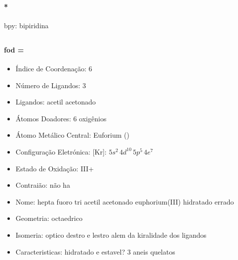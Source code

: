 \documentclass[12pt]{article}
\begin{document}
\paragraph{*}
bpy: bipiridina 

\noindent\begin{minipage}{\textwidth}
	
	\subsection{}
	\paragraph{fod =} 
	
	\begin{itemize}
   
   \item Índice de Coordenação:
   	6
	
   \item Número de Ligandos:
   	3
	
   \item Ligandos:
   	acetil acetonado
   
   \item Átomos Doadores:
   	6 oxigênios
   
   \item Átomo Metálico Central:
   	Euforium ()
   
   \item Configuração Eletrónica:
   	[Kr]: $5s^2\,4d^{10}\,5p^5\,4e^7$
   
   \item Estado de Oxidação:
   	III+
   
   \item Contraião:
   	não ha
   
   \item Nome:
   	hepta fuoro tri acetil acetonado euphorium(III) hidratado errado
   
   \item Geometria:
   	octaedrico
   
   \item Isomeria:
   	optico destro e lestro
		alem da kiralidade dos ligandos

	\item Caracteristicas:
		hidratado e estavel?
		3 aneis quelatos

	\end{itemize}
	
\end{minipage}
\end{document}
